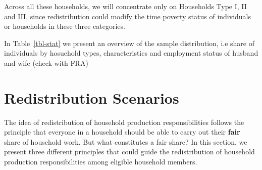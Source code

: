 \documentclass[
  11pt,
]{article}
\begin{document}
Across all these households, we will concentrate only on Households Type
I, II and III, since redistribution could modify the time poverty status
of individuals or households in these three categories.

In Table~\ref{tbl-stat} we present an overview of the sample
distribution, i.e share of individuals by hosuehold types,
characteristics and employment status of husband and wife (check with
FRA)

\begin{table}

\caption{\label{tbl-stat}Summary Statisitcs Population}


\end{table}%

\section{Redistribution Scenarios}\label{redistribution-scenarios}

The idea of redistribution of household production responsibilities
follows the principle that everyone in a household should be able to
carry out their \textbf{fair} share of household work. But what
constitutes a fair share? In this section, we present three different
principles that could guide the redistribution of household production
responsibilities among eligible household members.
\end{document}
